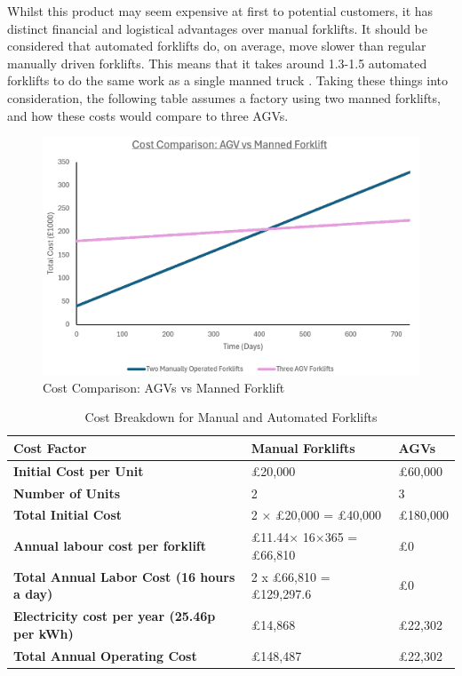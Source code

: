 \documentclass[12pt]{article}
\begin{document}
Whilst this product may seem expensive at first to potential customers, it has distinct financial and logistical advantages over manual forklifts. 
It should be considered that automated forklifts do, on average, move slower than regular manually driven forklifts. This means that it takes around 1.3-1.5 automated forklifts to do the same work as a single manned truck \cite{Pastor-Tella2024}. 
Taking these things into consideration, the following table assumes a factory using two manned forklifts, and how these costs would compare to three AGVs.
\begin{figure}[ht]
    \centering



        \includegraphics[width=0.7\linewidth]{CostComparison1.png}
        \caption{Cost Comparison: AGVs vs Manned Forklift}
        \label{fig:timeline}

\end{figure}


\FloatBarrier

 
\begin{table}[htbp]
\centering
\begin{tabular}{|l|l|l|}
\hline
\textbf{Cost Factor}                   & \textbf{Manual Forklifts}           & \textbf{AGVs } \\ \hline
\textbf{Initial Cost per Unit}          & £20,000                             & £60,000                               \\ \hline
\textbf{Number of Units}                & 2                                    & 3                                     \\ \hline
\textbf{Total Initial Cost}             & 2 × £20,000 = £40,000               & £180,000                \\ \hline
\textbf{Annual labour cost per forklift }& £11.44× 16×365 = £66,810      & £0                                    \\ \hline
\textbf{Total Annual Labor Cost (16 hours a day)}        & 2 x £66,810 = £129,297.6    & £0                                    \\ \hline
 \textbf{Electricity cost per year (25.46p per kWh) } & £14,868&£22,302\\\hline  
 
\textbf{Total Annual Operating Cost}    & £148,487& £22,302\\ \hline
 
  
\end{tabular}

\caption{Cost Breakdown for Manual and Automated Forklifts \cite{P.Hinz}}
\end{table}
\end{document}
